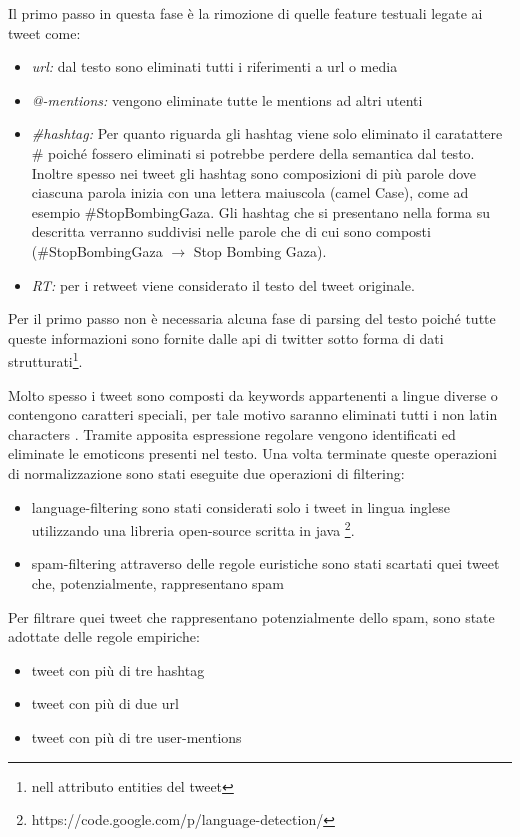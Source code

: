 Il primo passo in questa fase è la rimozione di quelle feature testuali legate ai tweet come:
\begin{itemize}
\item \emph{url:} dal testo sono eliminati tutti i riferimenti a url o media  
\item \emph{@-mentions:} vengono eliminate tutte le mentions ad altri utenti
\item  \emph{\#hashtag:} Per quanto riguarda gli hashtag viene solo eliminato il caratattere   \#   poiché fossero eliminati si potrebbe perdere della semantica dal testo.
Inoltre spesso nei tweet gli hashtag sono composizioni di più parole dove ciascuna parola inizia con una lettera maiuscola (camel Case), come ad esempio \#StopBombingGaza. Gli hashtag che si presentano nella forma su descritta verranno suddivisi nelle parole che di cui sono composti (\#StopBombingGaza $\rightarrow$ Stop Bombing Gaza).
\item \emph{RT:} per i retweet viene considerato il testo del tweet originale.
\end{itemize}
Per il primo passo non è necessaria alcuna fase di parsing del testo poiché tutte queste informazioni sono fornite dalle api di twitter sotto forma di dati strutturati\footnote{nell attributo entities del tweet}.

Molto spesso i tweet sono composti da keywords appartenenti a lingue diverse o contengono caratteri speciali, per tale motivo saranno eliminati tutti i non latin characters \cite{DBLP:conf/msm/BellaachiaA14} . 
 Tramite apposita espressione regolare vengono identificati ed eliminate le emoticons presenti nel testo.
 Una volta terminate queste operazioni di normalizzazione sono stati eseguite due operazioni di filtering:
 \begin{itemize}
 \item language-filtering sono stati considerati solo i tweet in lingua inglese
 utilizzando una libreria open-source scritta in java \footnote{https://code.google.com/p/language-detection/}.
 \item spam-filtering attraverso delle regole euristiche sono stati scartati quei tweet che, potenzialmente, rappresentano spam
 \end{itemize}
 
  
 
Per filtrare  quei tweet che rappresentano potenzialmente dello spam, sono state adottate delle regole empiriche:   \cite{Benevenuto10detectingspammers}
    \begin{itemize}
	\item tweet con più di tre hashtag
	\item tweet con più di due url
	\item tweet con più di tre user-mentions
	\end{itemize}
 


